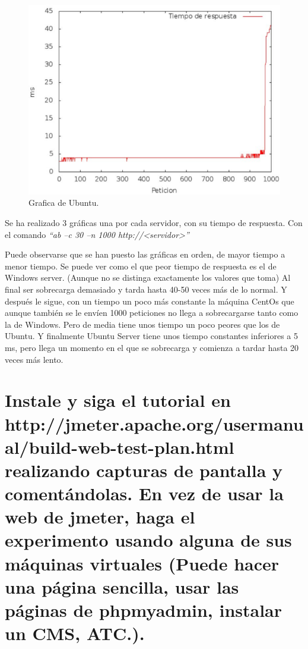 \begin{figure}[H]
\begin{center}
\includegraphics[scale=0.3]{imagenes/imagen3-3.eps}
\caption{Grafica de Ubuntu.}
\end{center}
\end{figure}

Se ha realizado 3 gráficas una por cada servidor, con su tiempo de  respuesta. Con el comando \textit{“ab –c 30 –n 1000 http://<servidor>” }

Puede observarse que se han puesto las gráficas en orden, de mayor tiempo a menor tiempo. Se puede ver como el que peor tiempo de respuesta es el de Windows server. (Aunque no se distinga 
exactamente los valores que toma) Al final ser sobrecarga demasiado y tarda hasta 40-50 veces más de lo normal. Y después le sigue, con un tiempo un poco más constante la máquina CentOs que aunque también se le envíen 1000 peticiones no llega a sobrecargarse tanto como la de Windows. Pero de media tiene unos tiempo un poco peores que los de Ubuntu. 
Y finalmente Ubuntu Server tiene unos tiempo constantes inferiores a 5 ms, pero llega un momento en el que se sobrecarga y comienza a tardar hasta 20 veces más lento. 

\section{Instale y siga el tutorial en http://jmeter.apache.org/usermanual/build-web-test-plan.html realizando capturas de pantalla y comentándolas. En vez de usar la web de jmeter, haga el experimento usando alguna de sus máquinas virtuales (Puede hacer una página sencilla, usar las páginas de phpmyadmin, instalar un CMS, ATC.).}

